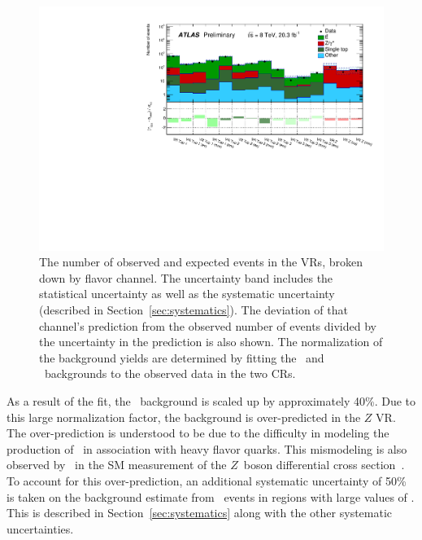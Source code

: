 \begin{figure}[ht]
  \centering
  \includegraphics[width=\textwidth]{figs/blstop/histpull_VR_detailed.pdf}
  \caption[
    The number of observed and expected events in the VRs,
    broken down by flavor channel.
    The deviation of that channel's prediction from the observed number of
    events divided by the uncertainty in the prediction is also shown.
  ]{
    The number of observed and expected events in the VRs,
    broken down by flavor channel.
    The uncertainty band includes the statistical uncertainty as well as the
    systematic uncertainty (described in Section~\ref{sec:systematics}).
    The deviation of that channel's prediction from the observed number of
    events divided by the uncertainty in the prediction is also shown.
    The normalization of the background yields are determined
    by fitting the \TTBAR\ and \ZGAMMAJETS\ backgrounds to the observed data in
    the two CRs.
  }
  \label{fig:pull_dist_vr}
\end{figure}

As a result of the fit, the \ZGAMMAJETS\ background is scaled up by
approximately 40\%.
Due to this large normalization factor, the background is over-predicted in
the $Z$ VR.
The over-prediction is understood to be due to the difficulty in modeling
the production of \ZGAMMA\ in association with heavy flavor quarks.
This mismodeling is also observed by \atlas\ in the SM measurement of
the $Z$~boson differential cross section~\cite{Aad:2013ysa,Aad:2014dvb}.
To account for this over-prediction, an additional systematic uncertainty of
50\% is taken on the background estimate from \ZGAMMAJETS\ events in regions
with large values of \HT.
This is described in Section~\ref{sec:systematics} along with the other
systematic uncertainties.

